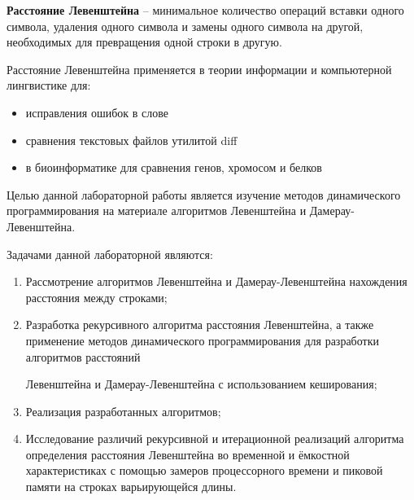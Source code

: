 
\textbf{Расстояние Левенштейна} \cite{levenshtein} – минимальное количество операций вставки одного символа, удаления одного символа и замены одного символа на другой, необходимых для превращения одной строки в другую.

Расстояние Левенштейна применяется в теории информации и компьютерной лингвистике для:

\begin{itemize}
	\item исправления ошибок в слове
	\item сравнения текстовых файлов утилитой diff
	\item в биоинформатике для сравнения генов, хромосом и белков
\end{itemize}

Целью данной лабораторной работы является изучение методов динамического программирования на материале алгоритмов
Левенштейна и Дамерау-Левенштейна. 

Задачами данной лабораторной являются:
\begin{enumerate}
	\item Рассмотрение алгоритмов Левенштейна и Дамерау-Левенштейна нахождения расстояния между строками;
	\item Разработка рекурсивного алгоритма расстояния Левенштейна, а также применение методов динамического программирования для разработки алгоритмов расстояний 
	
	Левенштейна и Дамерау-Левенштейна с использованием кеширования; 
	\item Реализация разработанных алгоритмов; 
	\item Исследование различий рекурсивной и
	итерационной реализаций алгоритма определения расстояния Левенштейна во временной и ёмкостной характеристиках с помощью замеров процессорного времени и пиковой памяти на строках варьирующейся длины.
\end{enumerate}
\newpage

\clearpage

